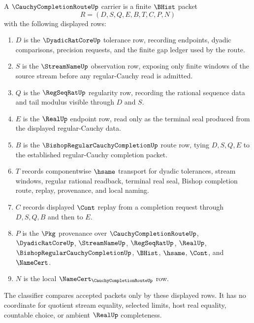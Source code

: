 \begin{definition}
\label{def:cauchy-completion-route-carrier}
A $\CauchyCompletionRouteUp$ carrier is a finite $\BHist$ packet
$$
R=(D,S,Q,E,B,T,C,P,N)
$$
with the following displayed rows:
\begin{enumerate}
\item $D$ is the $\DyadicRatCoreUp$ tolerance row, recording endpoints, dyadic comparisons, precision requests, and the finite gap ledger used by the route.
\item $S$ is the $\StreamNameUp$ observation row, exposing only finite windows of the source stream before any regular-Cauchy read is admitted.
\item $Q$ is the $\RegSeqRatUp$ regularity row, recording the rational sequence data and tail modulus visible through $D$ and $S$.
\item $E$ is the $\RealUp$ endpoint row, read only as the terminal seal produced from the displayed regular-Cauchy data.
\item $B$ is the $\BishopRegularCauchyCompletionUp$ route row, tying $D,S,Q,E$ to the established regular-Cauchy completion packet.
\item $T$ records componentwise $\hsame$ transport for dyadic tolerances, stream windows, regular rational readback, terminal real seal, Bishop completion route, replay, provenance, and local naming.
\item $C$ records displayed $\Cont$ replay from a completion request through $D,S,Q,B$ and then to $E$.
\item $P$ is the $\Pkg$ provenance over $\CauchyCompletionRouteUp$, $\DyadicRatCoreUp$, $\StreamNameUp$, $\RegSeqRatUp$, $\RealUp$, $\BishopRegularCauchyCompletionUp$, $\BHist$, $\hsame$, $\Cont$, and $\NameCert$.
\item $N$ is the local $\NameCert_{\CauchyCompletionRouteUp}$ row.
\end{enumerate}
The classifier compares accepted packets only by these displayed rows. It has no coordinate for quotient stream equality, selected limits, host real equality, countable choice, or ambient $\RealUp$ completeness.
\end{definition}

